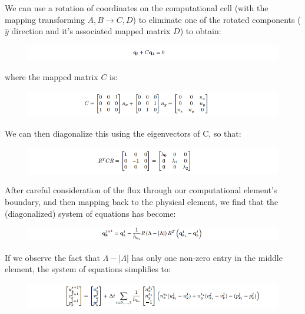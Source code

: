 \documentclass[letterpaper,10pt]{article}
\begin{document}
We can use a rotation of coordinates on the computational cell (with the mapping transforming $A,B \rightarrow C,D$) to eliminate one of the rotated components ($\hat{y}$ direction and it's associated mapped matrix $D$) to obtain:

\begin{figure}[!htb]
\includegraphics[width=1\textwidth]{3.PNG}
\end{figure}

where the mapped matrix $C$ is:

\begin{figure}[!htb]
\includegraphics[width=1\textwidth]{4.PNG}
\end{figure}

We can then diagonalize this using the eigenvectors of C, so that:

\begin{figure}[!htb]
\includegraphics[width=1\textwidth]{5.PNG}
\end{figure}
\newpage
After careful consideration of the flux through our computational element's boundary, and then mapping back to the physical element, we find that the (diagonalized) system of equations has become:

\begin{figure}[!htb]
\includegraphics[width=1\textwidth]{6.PNG}
\end{figure}

If we observe the fact that $\Lambda - |\Lambda|$ has only one non-zero entry in the middle element, the system of equations simplifies to:
\begin{figure}[!htb]
\includegraphics[width=1\textwidth]{7.PNG}
\end{figure}
\end{document}
